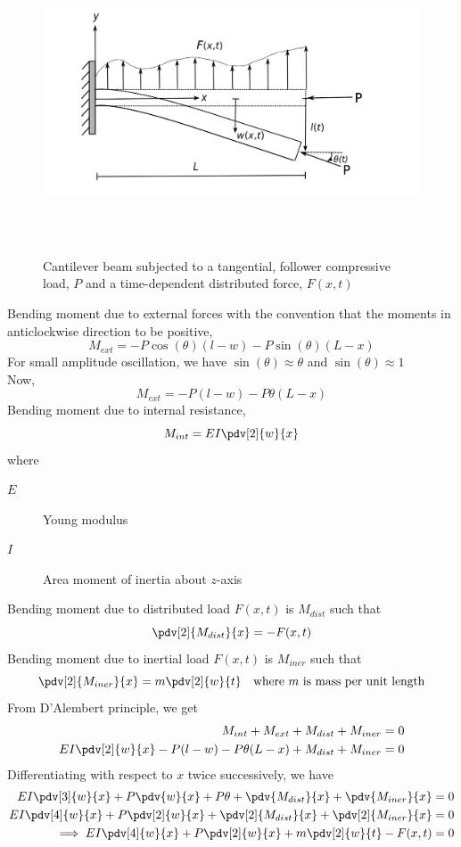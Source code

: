 \begin{figure}[h!]
	\centering
	\includegraphics[height=9cm,keepaspectratio]{cantilever_beam}
	\caption{Cantilever beam subjected to a tangential, follower compressive load, $P$ and a time-dependent distributed force, $F(x,t)$}
	\label{fig:derivation}
\end{figure}
Bending moment due to external forces with the convention that the moments in anticlockwise direction to be positive,
$$M_{ext} = -P\cos (\theta) (l - w) - P\sin(\theta) (L - x)$$
For small amplitude oscillation, we have $\sin (\theta) \approx \theta$ and $\sin (\theta) \approx 1$ \\
Now, $$M_{ext} = -P(l - w) - P\theta (L - x)$$
Bending moment due to internal resistance,
$$M_{int} = EI\pdv[2]{w}{x}$$
where 
\begin{description}
	\item[$E$] Young modulus
	\item[$I$] Area moment of inertia about $z$-axis
\end{description}
Bending moment due to distributed load $F(x,t)$ is $M_{dist}$ such that 
$$\pdv[2]{M_{dist}}{x} = -F(x,t)$$
Bending moment due to inertial load $F(x,t)$ is $M_{iner}$ such that 
$$\pdv[2]{M_{iner}}{x} = m\pdv[2]{w}{t} \quad \text{where $m$ is mass per unit length}$$
From D'Alembert principle, we get
\begin{align*}
M_{int} + M_{ext} + M_{dist} + M_{iner} &= 0 \\
EI\pdv[2]{w}{x} -P(l - w) - P\theta (L - x) + M_{dist} + M_{iner} &= 0
\end{align*}
Differentiating with respect to $x$ twice successively, we have
\begin{align*}
EI\pdv[3]{w}{x} + P \pdv{w}{x} + P\theta + \pdv{M_{dist}}{x} + \pdv{M_{iner}}{x} &= 0 \\
EI\pdv[4]{w}{x} + P \pdv[2]{w}{x} + \pdv[2]{M_{dist}}{x} + \pdv[2]{M_{iner}}{x} &= 0 \\
\implies EI\pdv[4]{w}{x} + P \pdv[2]{w}{x} + m\pdv[2]{w}{t} - F(x,t) &= 0
\end{align*}

